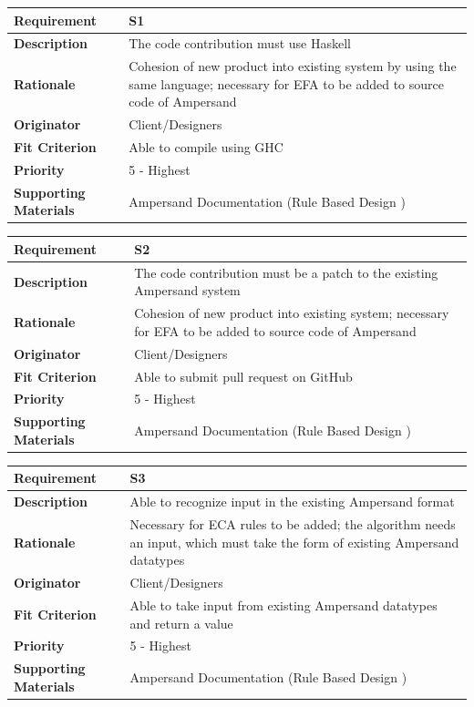 \documentclass[12pt]{report}
\begin{document}
{\setlength{\tabcolsep}{12pt} %
\begin{tabularx}{\textwidth}{>{\bfseries}C{3cm}X}
Requirement & S1 \\ 
\midrule
\endhead
Description  & The code contribution must use Haskell  
\\	Rationale & Cohesion of new product into existing system by using the same language; 
                    necessary for EFA to be added to source code of Ampersand 
\\	Originator & Client/Designers 
\\	Fit Criterion & Able to compile using GHC %
\\	Priority & 5 - Highest
\\	Supporting Materials & Ampersand Documentation (Rule Based Design \cite{RBD}) 
\vspace{12pt}
\end{tabularx}
}%
{\setlength{\tabcolsep}{12pt} %
\begin{tabularx}{\textwidth}{>{\bfseries}C{3cm}X}
Requirement & S2 \\ 
\midrule
\endhead
Description  & The code contribution must be a patch to the existing Ampersand system 
\\	Rationale & Cohesion of new product into existing system; 
                    necessary for EFA to be added to source code of Ampersand 
\\	Originator & Client/Designers 
\\	Fit Criterion & Able to submit pull request on GitHub %
\\	Priority & 5 - Highest
\\	Supporting Materials & Ampersand Documentation (Rule Based Design \cite {RBD}) 
\vspace{12pt}
\end{tabularx}
}%
{\setlength{\tabcolsep}{12pt} %
\begin{tabularx}{\textwidth}{>{\bfseries}C{3cm}X}
Requirement & S3 \\ 
\midrule
\endhead
	Description  & Able to recognize input in the existing Ampersand format
	\\	Rationale & Necessary for ECA rules to be added; the algorithm needs 
  an input, which must take the form of existing Ampersand datatypes 
	\\	Originator & Client/Designers 
	\\	Fit Criterion & Able to take input from existing Ampersand datatypes 
  and return a value
	\\	Priority & 5 - Highest 
	\\	Supporting Materials & Ampersand Documentation (Rule Based Design \cite{RBD}) 
\vspace{12pt}
\end{tabularx}
}%
\end{document}
